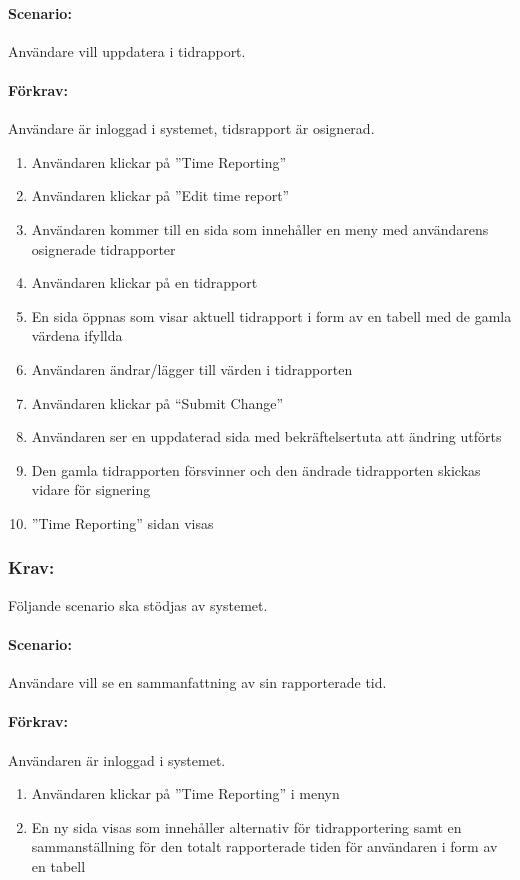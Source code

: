 \documentclass[paper=a4, fontsize=11pt,twoside]{article}
\begin{document}
\paragraph{Scenario:}Användare vill uppdatera i tidrapport.
\paragraph{Förkrav:}
Användare är inloggad i systemet, tidsrapport är osignerad.
\begin{enumerate}
\item Användaren klickar på ”Time Reporting”
\item	Användaren klickar på ”Edit time report”
\item	Användaren kommer till en sida som innehåller en meny med användarens osignerade tidrapporter
\item Användaren klickar på en tidrapport
\item	En sida öppnas som visar aktuell tidrapport i form av en tabell med de gamla värdena ifyllda
\item	Användaren ändrar/lägger till värden i tidrapporten
\item	Användaren klickar på “Submit Change”
\item Användaren ser en uppdaterad sida med bekräftelsertuta att ändring utförts
\item	Den gamla tidrapporten försvinner och den ändrade tidrapporten skickas vidare för signering
\item	”Time Reporting” sidan visas
\end{enumerate}

\newpage
\subsubsection{Krav:}Följande scenario ska stödjas av systemet.
\paragraph{Scenario:}Användare vill se en sammanfattning av sin rapporterade tid.
\paragraph{Förkrav:}
Användaren är inloggad i systemet.
\begin{enumerate}
\item  Användaren klickar på ”Time Reporting” i menyn
\item  En ny sida visas som innehåller alternativ för tidrapportering samt en sammanställning för den totalt rapporterade tiden för användaren i form av en tabell
\end{enumerate}
\end{document}
